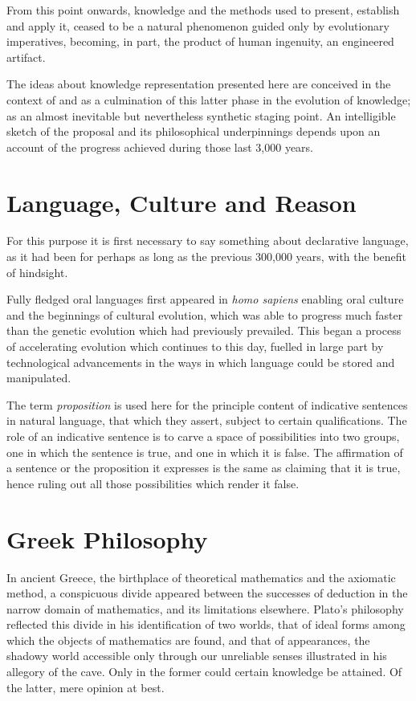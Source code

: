 \documentclass[10pt,titlepage]{book}
\begin{document}
From this point onwards, knowledge and the methods used to present, establish and apply it, ceased to be a natural phenomenon guided only by evolutionary imperatives, becoming, in part, the product of human ingenuity, an engineered artifact.

The ideas about knowledge representation presented here are conceived in the context of and as a culmination of this latter phase in the evolution of knowledge; as an almost inevitable but nevertheless synthetic staging point.
An intelligible sketch of the proposal and its philosophical underpinnings depends upon an account of the progress achieved during those last 3,000 years.

\section{Language, Culture and Reason}

For this purpose it is first necessary to say something about declarative language, as it had been for perhaps as long as the previous 300,000 years, with the benefit of hindsight.

Fully fledged oral languages first appeared in \emph{homo sapiens} enabling oral culture and the beginnings of cultural evolution, which was able to progress much faster than the genetic evolution which had previously prevailed.
This began a process of accelerating evolution which continues to this day, fuelled in large part by technological advancements in the ways in which language could be stored and manipulated.






The term \emph{proposition} is used here for the principle content of indicative sentences in natural language, that which they assert, subject to certain qualifications.
The role of an indicative sentence is to carve a space of possibilities into two groups, one in which the sentence is true, and one in which it is false.
The affirmation of a sentence or the proposition it expresses is the same as claiming that it is true, hence ruling out all those possibilities which render it false.

\section{Greek Philosophy}
  
In ancient Greece, the birthplace of theoretical mathematics and the axiomatic method, a conspicuous divide appeared between the successes of deduction in the narrow domain of mathematics, and its limitations elsewhere.
Plato's philosophy reflected this divide in his identification of two worlds, that of ideal forms among which the objects of mathematics are found, and that of appearances, the shadowy world accessible only through our unreliable senses illustrated in his allegory of the cave.
Only in the former could certain knowledge be attained.
Of the latter, mere opinion at best.
\end{document}
